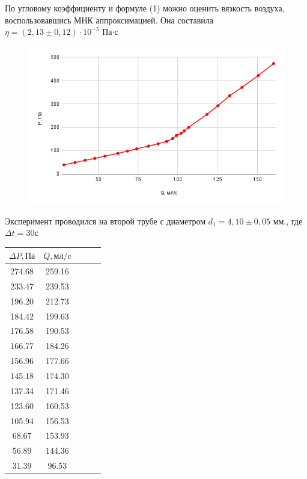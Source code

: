 \documentclass[a4paper, 12pt]{article}
\begin{document}
По угловому коэффициенту и формуле (1) можно оценить вязкость воздуха, воспользовавшись МНК аппроксимацией. Она составила 
$\eta = (2,13 \pm 0,12) \cdot 10^{-5}$ Па$\cdot$с

\begin{figure}[H]
    \centering
    \includegraphics[scale=0.7]{chart1.png}
\end{figure}

Эксперимент проводился на второй трубе с диаметром $d_1=4,10\pm0,05$ мм., где $\varDelta t = 30 \text{с}$

\begin{table}[h]
    \centering
    \begin{tabular}{|c|c|c|c|c|}
    \hline
    \hline
    $\varDelta P, \text{Па}$ & $Q, \text{мл/c}$ \\ \hline
    274.68 & 259.16   \\ \hline
    233.47 & 239.53   \\ \hline
    196.20 & 212.73   \\ \hline
    184.42 & 199.63   \\ \hline
    176.58 & 190.53   \\ \hline
    166.77 & 184.26   \\ \hline
    156.96 & 177.66   \\ \hline
    145.18 & 174.30   \\ \hline
    137.34 & 171.46   \\ \hline
    123.60 & 160.53   \\ \hline
    105.94 & 156.53   \\ \hline
    68.67  & 153.93   \\ \hline 
    56.89  & 144.36   \\ \hline
    31.39  & 96.53    \\ \hline \hline
    \end{tabular}
\end{table}
\end{document}
